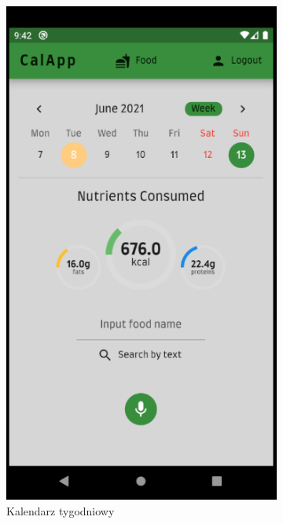 \documentclass[12pt, a4paper]{article}
\begin{document}
\begin{sloppypar}
{{    \begin{figure}[H]
      \centering
      \begin{subfigure}{.33\textwidth}
        \centering
        \includegraphics[width=.95\linewidth]{screen_home_diff_day.PNG}
        \caption{Kalendarz tygodniowy}
        \label{fig:screen_calendar1}
      \end{subfigure}%
      \begin{subfigure}{.33\textwidth}
        \centering

\end{subfigure}
\end{figure}}}
\end{sloppypar}
\end{document}
